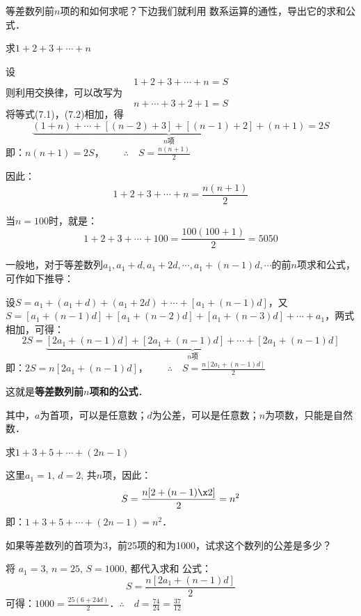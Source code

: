 等差数列前$n$项的和如何求呢？下边我们就利用
数系运算的通性，导出它的求和公式．

\begin{example}
    求$1+2+3+\cdots+n$
\end{example}

\begin{solution}
    设
    \begin{equation}
        1+2+3+\cdots+n=S
    \end{equation}
    则利用交换律，可以改写为
    \begin{equation}
        n+\cdots+3+2+1=S
    \end{equation}
将等式(7.1)，(7.2)相加，得
\[\underbrace{(1+n)+\cdots +[(n-2)+3]+[(n-1)+2]+(n+1)}_{n\text{项}}=2S\]
即：$n(n+1)=2S$，$\qquad \therefore\quad S=\frac{n(n+1)}{2}$
\end{solution}


因此：
\[1+2+3+\cdots+n=\frac{n(n+1)}{2}\]

当$n=100$时，就是：
\[1+2+3+\cdots+100=\frac{100(100+1)}{2}=5050\]

一般地，对于等差数列$a_1,a_1+d,a_1+2d,\cdots,a_1+(n-1)d,\cdots$的前$n$项求和公式，可作如下推导：

设$S=a_1+(a_1+d)+(a_1+2d)+\cdots+[a_1+(n-1)d]$，又
$S=[a_1+(n-1)d]+[a_1+(n-2)d]+[a_1+(n-3)d]+\cdots+a_1$，两式相加，可得：
\[2S=\underbrace{[2a_1+(n-1)d]+[2a_1+(n-1)d]+\cdots+[2a_1+(n-1)d]}_{n\text{项}}\]
即：$2S=n[2a_1+(n-1)d]$，$\qquad \therefore\quad S=\frac{n[2a_1+(n-1)d]}{2}$

这就是\textbf{等差数列前$n$项和的公式}．

其中，$a$为首项，可以是任意数；$d$为公差，可以是任意数；$n$为项数，只能是自然数．

\begin{example}
    求$1+3+5+\cdots+(2n-1)$
\end{example}

\begin{solution}
    这里$a_1=1$, $d=2$, 共$n$项，因此：
\[S=\frac{n[2+(n-1)\x 2]}{2}=n^2 \]
即：$1+3+5+\cdots+(2n-1)=n^2$．
\end{solution}

\begin{example}
    如果等差数列的首项为3，前25项的和为1000，试求这个数列的公差是多少？
\end{example}

\begin{solution}
    将 $a_1=3$, $n=25$, $S=1000$, 都代入求和
公式：
\[S=\frac{n [2a_1+ (n-1) d]}{2}\]
可得：$1000=\frac{25(6+24d)}{2}$．\qquad$\therefore\quad d=\frac{74}{24}=\frac{37}{12}$
\end{solution}

